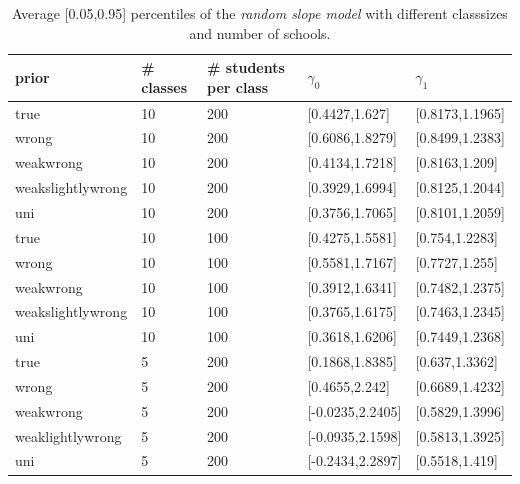 \begin{table}[!ht]
\begin{center}
\begin{tabular}{l l l l  l}
prior & \# classes & \#  students per class &  $\gamma_0$ & $ \gamma_1$ \\
\hline
\hline
true & 10  &  200  &  [0.4427,1.627]  &  [0.8173,1.1965] \\ %
wrong & 10  &  200  &  [0.6086,1.8279]  &  [0.8499,1.2383]\\ %
weakwrong & 10  &  200  &  [0.4134,1.7218]  &  [0.8163,1.209] \\  %
weakslightlywrong & 10  &  200  &  [0.3929,1.6994]  &  [0.8125,1.2044]\\ %
uni & 10  &  200  &  [0.3756,1.7065]  &  [0.8101,1.2059]\\ %
\hline
true &10  &  100  &  [0.4275,1.5581]  &  [0.754,1.2283]\\
wrong&  10  &  100  &  [0.5581,1.7167]  &  [0.7727,1.255]\\
weakwrong & 10  &  100  &  [0.3912,1.6341]  &  [0.7482,1.2375]\\
weakslightlywrong &10  &  100  &  [0.3765,1.6175]  &  [0.7463,1.2345]\\
uni & 10  &  100  &  [0.3618,1.6206]  &  [0.7449,1.2368]\\
\hline
true & 5  &  200  &  [0.1868,1.8385]  &  [0.637,1.3362]\\
wrong & 5  &  200  &  [0.4655,2.242]  &  [0.6689,1.4232]\\
weakwrong & 5  &  200  &  [-0.0235,2.2405]  &  [0.5829,1.3996]\\
weaklightlywrong &5  &  200  &  [-0.0935,2.1598]  &  [0.5813,1.3925]\\
uni &5  &  200  &  [-0.2434,2.2897]  &  [0.5518,1.419]\\
\end{tabular}
\end{center}
\caption{ Average [0.05,0.95] percentiles of the \emph{random slope model}  with different classsizes and number of schools. }
\label{tab:quantiles}
\end{table}

